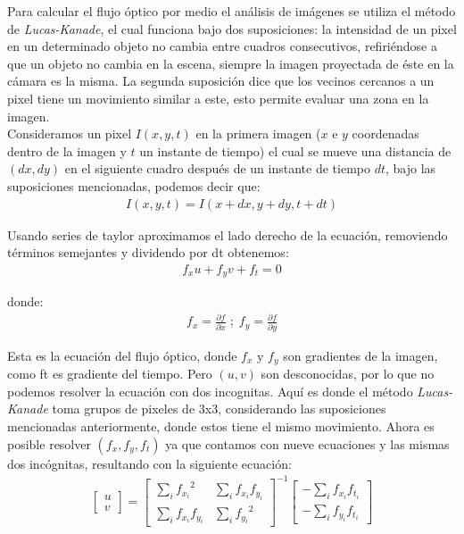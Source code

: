 \documentclass{iccmemoria}
\begin{document}
Para calcular el flujo óptico por medio el análisis de imágenes se utiliza el método de \emph{Lucas-Kanade}, el cual funciona bajo dos suposiciones: la intensidad de un pixel en un determinado objeto no cambia entre cuadros consecutivos, refiriéndose a que un objeto no cambia en la escena, siempre la imagen proyectada de éste en la cámara es la misma. La segunda suposición dice que los vecinos cercanos a un pixel tiene un movimiento similar a este, esto permite evaluar una zona en la imagen.\\

Consideramos un pixel $I(x, y,t)$ en la primera imagen ($x$ e $y$ coordenadas dentro de la imagen y $t$ un instante de tiempo) el cual se mueve una distancia de $(dx, dy)$ en el siguiente cuadro después de un instante de tiempo $dt$, bajo las suposiciones mencionadas, podemos decir que:
\begin{equation}
	\begin{split}
		I(x,y,t) = I(x+dx, y+dy, t+dt)
	\end{split}
\end{equation}

Usando series de taylor aproximamos el lado derecho de la ecuación, removiendo términos semejantes y dividendo por dt obtenemos:
\begin{equation}
	\begin{split}
		f_x u + f_y v + f_t = 0
	\end{split}
\end{equation}

donde:
\begin{equation}
	\begin{split}
		f_x = \frac{\partial f}{\partial x} \; ; \; f_y = \frac{\partial f}{\partial y}
	\end{split}
\end{equation}

Esta es la ecuación del flujo óptico, donde $f_x$ y $f_y$ son gradientes de la imagen, como ft es gradiente del tiempo. Pero $(u, v)$ son desconocidas, por lo que no podemos resolver la ecuación con dos incognitas. Aquí es donde el método \emph{Lucas-Kanade} toma grupos de pixeles de 3x3, considerando las suposiciones mencionadas anteriormente, donde estos tiene el mismo movimiento. Ahora es posible resolver $(f_x, f_y, f_t)$ ya que contamos con nueve ecuaciones y las mismas dos incógnitas, resultando con la siguiente ecuación:
\begin{equation}
	\begin{split}
		\begin{bmatrix} u \\ v \end{bmatrix} = \begin{bmatrix} \sum_{i}{f_{x_i}}^2 & \sum_{i}{f_{x_i} f_{y_i} } \\ \sum_{i}{f_{x_i} f_{y_i}} & \sum_{i}{f_{y_i}}^2 \end{bmatrix}^{-1} \begin{bmatrix} - \sum_{i}{f_{x_i} f_{t_i}} \\ - \sum_{i}{f_{y_i} f_{t_i}} \end{bmatrix}
	\end{split}
\end{equation}
\end{document}
